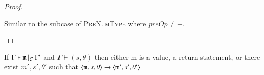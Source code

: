 \begin{proof}
\begin{case}[PreNumType]
\begin{subcase}
	\end{subcase}

  \end{case}

  \begin{case}[PostOpType]\label{case:prog-postoptype}

  	Similar to the subcase of \textsc{PreNumType} where $preOp\neq-$.

  \end{case}

\end{proof}

\begin{theorem}\label{case:prog-statProgress}

  If $\Gamma{}\vdash\mathtt{m}\, |_C \:\Gamma '$ and $\Gamma \vdash (s, \theta)$ then either m is a
  value, a return statement, or there exist $m',s', \theta'$ such that
  $\langle{}\mathtt{m},s,\theta\rangle{}\rightarrow{}\langle{}\mathtt{m'},s',\theta'\rangle$

\end{theorem}

